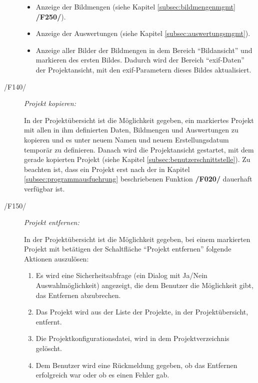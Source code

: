 \begin{description}
\begin{itemize}
				\item Anzeige der Bildmengen (siehe Kapitel \ref{subsec:bildmengenmgmt} \textbf{/F250/}).
				
				\item Anzeige der Auswertungen (siehe Kapitel \ref{subsec:auswertungsmgmt}).
				
				\item Anzeige aller Bilder der Bildmengen in dem Bereich "`Bildansicht"' und markieren des ersten Bildes. Dadurch wird der Bereich "`\gls{exif}-Daten"' der Projektansicht, mit den \gls{exif}-Parametern dieses Bildes aktualisiert.
			
			\end{itemize}		
		
		\item[/F140/] \textit{Projekt kopieren:}\par In der Projektübersicht ist die Möglichkeit gegeben, ein markiertes Projekt mit allen in ihm definierten Daten, Bildmengen und Auswertungen zu kopieren und es unter neuem Namen und neuem Erstellungsdatum temporär zu definieren. Danach wird die Projektansicht gestartet, mit dem gerade kopierten Projekt (siehe Kapitel \ref{subsec:benutzerschnittstelle}). Zu beachten ist, dass ein Projekt erst nach der in Kapitel \ref{subsec:programmausfuehrung} beschriebenen Funktion \textbf{/F020/} dauerhaft verfügbar ist.
		
		\item[/F150/] \textit{Projekt entfernen:}\par In der Projektübersicht ist die Möglichkeit gegeben, bei einem markierten Projekt mit betätigen der Schaltfläche "`Projekt entfernen"' folgende Aktionen auszulösen:
			
			\begin{enumerate}
				
				\item Es wird eine Sicherheitsabfrage (ein Dialog mit Ja/Nein Auswahlmöglichkeit) angezeigt, die dem Benutzer die Möglichkeit gibt, das Entfernen abzubrechen.
				
				\item Das Projekt wird aus der Liste der Projekte, in der Projektübersicht, entfernt.
				
				\item Die Projektkonfigurationsdatei, wird in dem Projektverzeichnis gelöscht.
				
				\item Dem Benutzer wird eine Rückmeldung gegeben, ob das Entfernen erfolgreich war oder ob es einen Fehler gab.
			

\end{enumerate}
\end{description}
